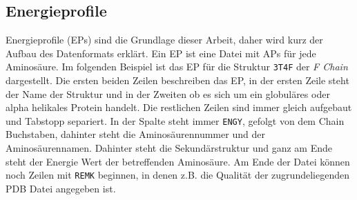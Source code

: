 \subsection{Energieprofile}
\label{sec:Energieprofil}
Energieprofile (EPs) sind die Grundlage dieser Arbeit, daher wird kurz der Aufbau des Datenformats erklärt. Ein \ac{EP} ist eine Datei mit \ac{APs} für jede Aminosäure. Im folgenden Beispiel ist das \ac{EP} für die Struktur \texttt{3T4F} der \emph{F Chain} dargestellt. Die ersten beiden Zeilen beschreiben das \ac{EP}, in der ersten Zeile steht der Name der Struktur und in der Zweiten ob es sich um ein globuläres oder alpha helikales Protein handelt. Die restlichen Zeilen sind immer gleich aufgebaut und Tabstopp separiert. In der Spalte steht immer \texttt{ENGY}, gefolgt von dem Chain Buchstaben, dahinter steht die Aminosäurennummer und der Aminosäurennamen. Dahinter steht die Sekundärstruktur und ganz am Ende steht der Energie Wert der betreffenden Aminosäure. Am Ende der Datei können noch Zeilen mit \texttt{REMK} beginnen, in denen z.B. die Qualität der zugrundeliegenden \ac{PDB} Datei angegeben ist.

